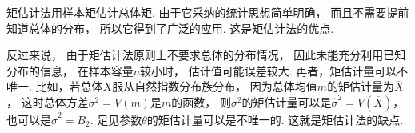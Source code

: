 \begin{remark}
矩估计法用样本矩估计总体矩.
由于它采纳的统计思想简单明确，
而且不需要提前知道总体的分布，
所以它得到了广泛的应用.
这是矩估计法的优点.

反过来说，
由于矩估计法原则上不要求总体的分布情况，
因此未能充分利用已知分布的信息，
在样本容量\(n\)较小时，
估计值可能误差较大.
再者，矩估计量可以不唯一.
比如，若总体\(X\)服从自然指数分布族分布，
因为总体均值\(m\)的矩估计量为\(\overline{X}\)，
这时总体方差\(\sigma^2 = V(m)\)是\(m\)的函数，
则\(\sigma^2\)的矩估计量可以是\(\hat{\sigma}^2 = V(\overline{X})\)，
也可以是\(\hat{\sigma}^2 = B_2\).
足见参数\(\theta\)的矩估计量可以是不唯一的.
这就是矩估计法的缺点.
\end{remark}
